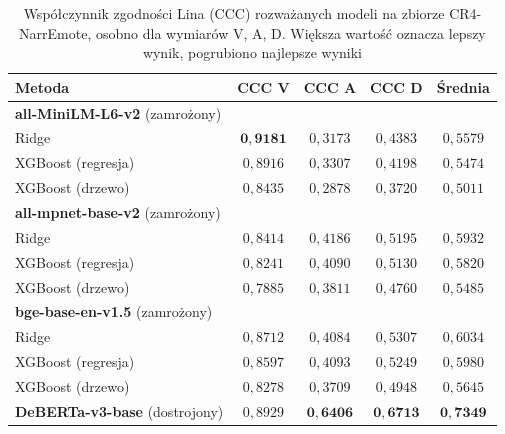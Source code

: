 \begin{table}[htbp]
    \centering
    \small
    \caption{Współczynnik zgodności Lina (CCC) rozważanych modeli na zbiorze CR4-NarrEmote, osobno dla wymiarów V, A, D. Większa wartość oznacza lepszy wynik, pogrubiono najlepsze wyniki}
    \begin{tabular}{l c c c c}
        \toprule
        \textbf{Metoda} & \textbf{CCC V} & \textbf{CCC A} & \textbf{CCC D} & \textbf{Średnia} \\
        \midrule
        \multicolumn{5}{l}{\textbf{all-MiniLM-L6-v2} (zamrożony)} \\
        \hspace{1em}Ridge              & $\mathbf{0{,}9181}$ & $0{,}3173$ & $0{,}4383$ & $0{,}5579$ \\
        \hspace{1em}XGBoost (regresja) & $0{,}8916$ & $0{,}3307$ & $0{,}4198$ & $0{,}5474$ \\
        \hspace{1em}XGBoost (drzewo)   & $0{,}8435$ & $0{,}2878$ & $0{,}3720$ & $0{,}5011$ \\
        \midrule
        \multicolumn{5}{l}{\textbf{all-mpnet-base-v2} (zamrożony)} \\
        \hspace{1em}Ridge              & $0{,}8414$ & $0{,}4186$ & $0{,}5195$ & $0{,}5932$ \\
        \hspace{1em}XGBoost (regresja) & $0{,}8241$ & $0{,}4090$ & $0{,}5130$ & $0{,}5820$ \\
        \hspace{1em}XGBoost (drzewo)   & $0{,}7885$ & $0{,}3811$ & $0{,}4760$ & $0{,}5485$ \\
        \midrule
        \multicolumn{5}{l}{\textbf{bge-base-en-v1.5} (zamrożony)} \\
        \hspace{1em}Ridge              & $0{,}8712$ & $0{,}4084$ & $0{,}5307$ & $0{,}6034$ \\
        \hspace{1em}XGBoost (regresja) & $0{,}8597$ & $0{,}4093$ & $0{,}5249$ & $0{,}5980$ \\
        \hspace{1em}XGBoost (drzewo)   & $0{,}8278$ & $0{,}3709$ & $0{,}4948$ & $0{,}5645$ \\
        \midrule
        \textbf{DeBERTa-v3-base} (dostrojony) & $0{,}8929$ & $\mathbf{0{,}6406}$ & $\mathbf{0{,}6713}$ & $\mathbf{0{,}7349}$ \\
        \bottomrule
    \end{tabular}
    \label{tab:ccc_comp}
\end{table}

